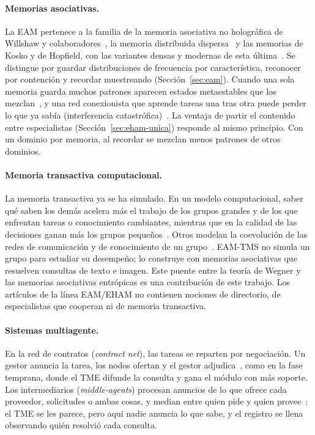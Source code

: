 \paragraph{Memorias asociativas.}
La EAM pertenece a la familia de la memoria asociativa no holográfica de Willshaw y
colaboradores~\cite{willshaw1969nonholographic}, la memoria distribuida
dispersa~\cite{kanerva1988sparse} y las memorias de Kosko y de Hopfield, con las variantes
densas y modernas de esta última~\cite{hopfield1982neural,kosko1988bidirectional,krotov2016dense,ramsauer2021hopfield}.
Se distingue por guardar distribuciones de frecuencia por característica, reconocer
por contención y recordar muestreando (Sección~\ref{sec:eam}).
Cuando una sola memoria guarda muchos patrones aparecen estados metaestables que los
mezclan~\cite{amit1985spin,ramsauer2021hopfield}, y una red conexionista que aprende tareas una tras otra puede perder lo que ya sabía
(interferencia catastrófica)~\cite{mccloskey1989catastrophic}.
La ventaja de partir el contenido entre especialistas (Sección~\ref{sec:eham-unica})
responde al mismo principio.
Con un dominio por memoria, al recordar se mezclan menos
patrones de otros dominios.

\paragraph{Memoria transactiva computacional.}
La memoria transactiva ya se ha simulado.
En un modelo computacional, saber qué saben los demás acelera más el trabajo de los
grupos grandes y de los que enfrentan tareas o conocimiento cambiantes, mientras que en la
calidad de las decisiones ganan más los grupos pequeños~\cite{ren2006contingent}.
Otros modelan la coevolución de las
redes de comunicación y de conocimiento de un grupo~\cite{palazzolo2006coevolution}.
EAM-TMS no simula un grupo para estudiar su desempeño; lo construye con memorias
asociativas que resuelven consultas de texto e imagen.
Este puente entre la teoría de Wegner y las memorias asociativas entrópicas es una
contribución de este trabajo.
Los artículos de la línea EAM/EHAM no contienen nociones de directorio, de especialistas que cooperan ni de memoria transactiva.

\paragraph{Sistemas multiagente.}
En la red de contratos (\textit{contract net}), las tareas se reparten por negociación.
Un gestor anuncia la tarea, los nodos ofertan y el gestor adjudica~\cite{smith1980contract},
como en la fase temprana, donde el TME difunde la consulta y gana el módulo con más
soporte.
Los intermediarios (\textit{middle-agents}) procesan anuncios de lo que ofrece
cada proveedor, solicitudes o ambas cosas, y median entre quien pide y quien
provee~\cite{decker1997middle}; el TME se les parece, pero aquí nadie anuncia lo que
sabe, y el registro se llena observando quién resolvió cada consulta.

